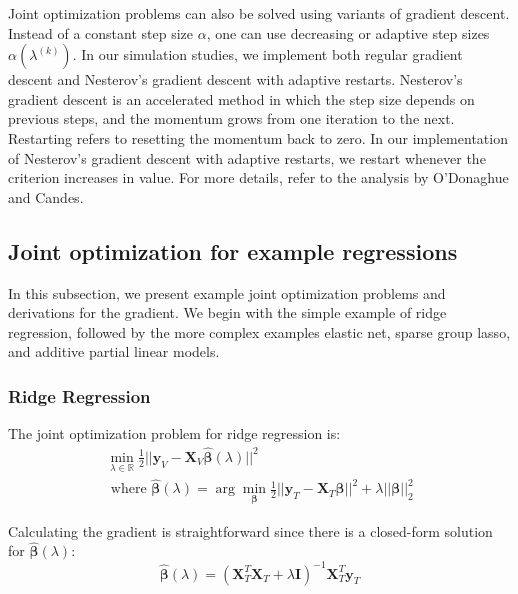 \documentclass[10pt,letterpaper]{article}
\begin{document}
Joint optimization problems can also be solved using variants of gradient descent. Instead of a constant step size $\alpha$, one can use decreasing or adaptive step sizes $\alpha(\lambda^{(k)})$. In our simulation studies, we implement both regular gradient descent and Nesterov's gradient descent with adaptive restarts. Nesterov's gradient descent is an accelerated method in which the step size depends on previous steps, and the momentum grows from one iteration to the next. Restarting refers to resetting the momentum back to zero. In our implementation of Nesterov's gradient descent with adaptive restarts, we restart whenever the criterion increases in value. For more details, refer to the analysis by O'Donaghue and Candes.

\subsection{Joint optimization for example regressions}

In this subsection, we present example joint optimization problems and derivations for the gradient. We begin with the simple example of ridge regression, followed by the more complex examples elastic net, sparse group lasso, and additive partial linear models.

\subsubsection{Ridge Regression}

The joint optimization problem for ridge regression is:
\begin{equation}
\begin{array}{c}
\min_{\lambda\in \mathbb{R}} \frac{1}{2} \lvert\lvert \boldsymbol{y}_V - \boldsymbol{X}_V \hat{\boldsymbol{\beta}} (\lambda) \rvert\rvert ^2 \\
\text{  where  } \hat{\boldsymbol{\beta}} (\lambda) = \arg \min_{\boldsymbol{\beta}} \frac{1}{2} \lvert\lvert \boldsymbol{y}_T - \boldsymbol{X}_T \boldsymbol{\beta} \rvert\rvert ^2 + \lambda \lvert\lvert \boldsymbol{\beta} \rvert\rvert_2^2
\end{array}
\end{equation}

Calculating the gradient is straightforward since there is a closed-form solution for $\hat{\boldsymbol{\beta}}(\lambda)$:
\begin{equation}
\hat{\boldsymbol{\beta}} (\lambda) = (\boldsymbol{X}_T^T\boldsymbol{X}_T + \lambda \boldsymbol{I})^{-1}\boldsymbol{X}_T^T\boldsymbol{y}_T
\end{equation}
\end{document}

